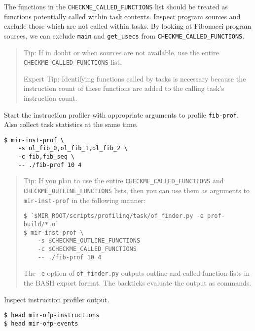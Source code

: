 \documentclass[11pt,a4paper]{article}
\begin{document}
The functions in the \texttt{CHECKME\_CALLED\_FUNCTIONS} list should be treated as functions potentially called within task contexts.  Inspect program sources and exclude those which are not called within tasks.  By looking at Fibonacci program sources, we can exclude \texttt{main} and \texttt{get\_usecs} from \texttt{CHECKME\_CALLED\_FUNCTIONS}.

\begin{framed}
\begin{quote}
Tip: If in doubt or when sources are not available, use the entire \texttt{CHECKME\_CALLED\_FUNCTIONS} list.

Expert Tip: Identifying functions called by tasks is necessary because the instruction count of these functions are added to the calling task's instruction count.
\end{quote}
\end{framed}

Start the instruction profiler with appropriate arguments to profile \texttt{fib-prof}.  Also collect task statistics at the same time.

\begin{lstlisting}[style=MyInputStyle]
$ mir-inst-prof \
    -s ol_fib_0,ol_fib_1,ol_fib_2 \
    -c fib,fib_seq \
    -- ./fib-prof 10 4
\end{lstlisting}

\begin{framed}
\begin{quote}
    Tip: If you plan to use the entire \texttt{CHECKME\_CALLED\_FUNCTIONS} and \texttt{CHECKME\_OUTLINE\_FUNCTIONS} lists, then you can use them as arguments to \texttt{mir-inst-prof} in the following manner:

\begin{lstlisting}[style=MyInputStyle]
$ `$MIR_ROOT/scripts/profiling/task/of_finder.py -e prof-build/*.o`
$ mir-inst-prof \
    -s $CHECKME_OUTLINE_FUNCTIONS
    -c $CHECKME_CALLED_FUNCTIONS
    -- ./fib-prof 10 4
\end{lstlisting}

The \texttt{-e} option of \texttt{of\_finder.py} outputs outline and called function lists in the BASH export format. The backticks evaluate the output as commands.
\end{quote}
\end{framed}

Inspect instruction profiler output.

\begin{lstlisting}[style=MyInputStyle]
$ head mir-ofp-instructions
$ head mir-ofp-events
\end{lstlisting}
\end{document}
